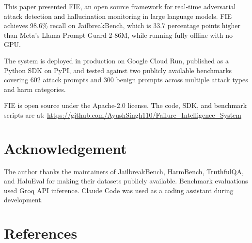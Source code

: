 \documentclass[12pt,a4paper]{article}
\begin{document}
This paper presented FIE, an open source framework for real-time adversarial
attack detection and hallucination monitoring in large language models. FIE
achieves 98.6\% recall on JailbreakBench, which is 33.7 percentage points
higher than Meta's Llama Prompt Guard 2-86M, while running fully offline
with no GPU.

The system is deployed in production on Google Cloud Run, published as a
Python SDK on PyPI, and tested against two publicly available benchmarks
covering 602 attack prompts and 300 benign prompts across multiple attack
types and harm categories.

FIE is open source under the Apache-2.0 license. The code, SDK, and
benchmark scripts are at:
\url{https://github.com/AyushSingh110/Failure_Intelligence_System}

\section{Acknowledgement}

The author thanks the maintainers of JailbreakBench, HarmBench, TruthfulQA,
and HaluEval for making their datasets publicly available. Benchmark
evaluations used Groq API inference. Claude Code was used as a coding
assistant during development.

\section{References}
\end{document}
